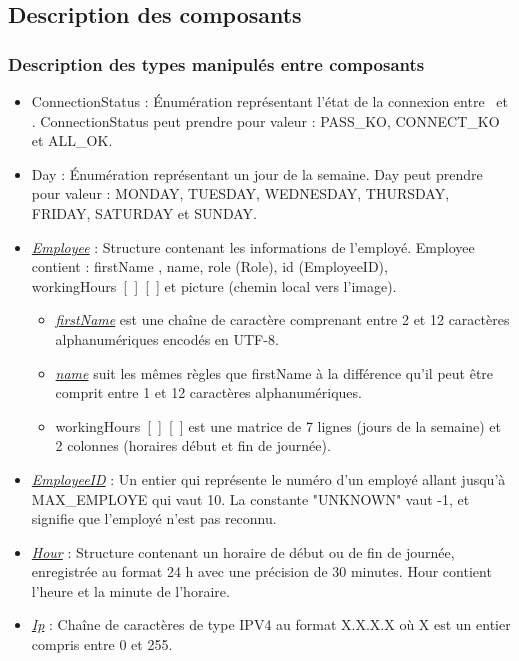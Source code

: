 \newpage

\subsection{Description des composants}

\subsubsection{Description des types manipulés entre composants}%

\begin{itemize}
    \item ConnectionStatus : Énumération représentant l'état de la connexion entre \appliA~et \appliLin.
    ConnectionStatus peut prendre pour valeur : PASS\_KO, CONNECT\_KO et ALL\_OK.
    \item Day : Énumération représentant un jour de la semaine.
    Day peut prendre pour valeur : MONDAY, TUESDAY, WEDNESDAY, THURSDAY, FRIDAY, SATURDAY et SUNDAY.
    \item \hyperlink{emp}{\textit{Employee}} : Structure contenant les informations de l'employé.
    Employee contient : firstName , name, role (Role), id (EmployeeID), workingHours~[~]~[~] et picture (chemin local vers l'image).
    \begin{itemize}
        \item \hyperlink{prenom}{\textit{firstName}} est une chaîne de caractère comprenant entre 2 et 12 caractères alphanumériques encodés en UTF-8.
        \item \hyperlink{nom}{\textit{name}} suit les mêmes règles que firstName à la différence qu'il peut être comprit entre 1 et 12 caractères alphanumériques.
        \item workingHours~[~]~[~] est une matrice de 7 lignes (jours de la semaine) et 2 colonnes (horaires début et fin de journée).
    \end{itemize}    
    \item \hyperlink{idEmp}{\textit{EmployeeID}} : Un entier qui représente le numéro d'un employé allant jusqu'à MAX\_EMPLOYE qui vaut 10. La constante "UNKNOWN" vaut -1, et signifie que l'employé n'est pas reconnu.
    \item \hyperlink{hor}{\textit{Hour}} : Structure contenant un horaire de début ou de fin de journée, enregistrée au format 24 h avec une précision de 30 minutes.
    Hour contient l'heure et la minute de l'horaire.
    \item \hyperlink{IP}{\textit{Ip}} : Chaîne de caractères de type IPV4 au format X.X.X.X où X est un entier compris entre 0 et 255. 

\end{itemize}
